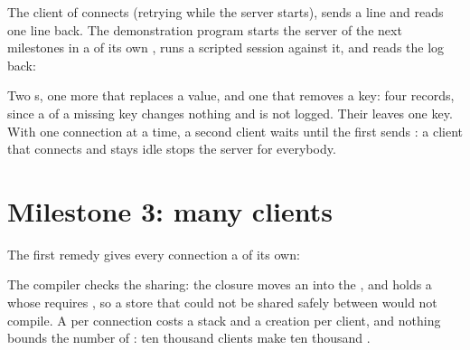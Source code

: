 The client of  connects (retrying while the server starts), sends a line and reads one line back. The
demonstration program starts the server of the next milestones in a  of its own , runs a scripted session
against it, and reads the log back:

\label{lst:b2:project-key-value-server:demo}

\label{out:b2:project-key-value-server:demo}

Two s, one more that replaces a value, and one  that removes a key: four records, since a 
of a missing key changes nothing and is not logged. Their  leaves one key. With one connection at a time, a
second client waits until the first sends : a client that connects and stays idle stops the server for
everybody.

\section{Milestone 3: many clients}\label{sec:b2:project-key-value-server:concurrency}

The first remedy gives every connection a  of its own:

\label{lst:b2:project-key-value-server:per-connection}

The compiler checks the sharing: the closure moves an  into the , and  holds a
 whose  requires , so a store that could not be shared safely between
 would not compile. A  per connection costs a stack and a creation per client, and nothing bounds the
number of : ten thousand clients make ten thousand .

